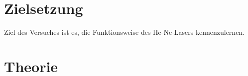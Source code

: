 \section{Zielsetzung}
\label{sec:Zielsetzung}
Ziel des Versuches ist es, die Funktionsweise des He-Ne-Lasers kennenzulernen.

\section{Theorie}
\label{sec:Theorie}


